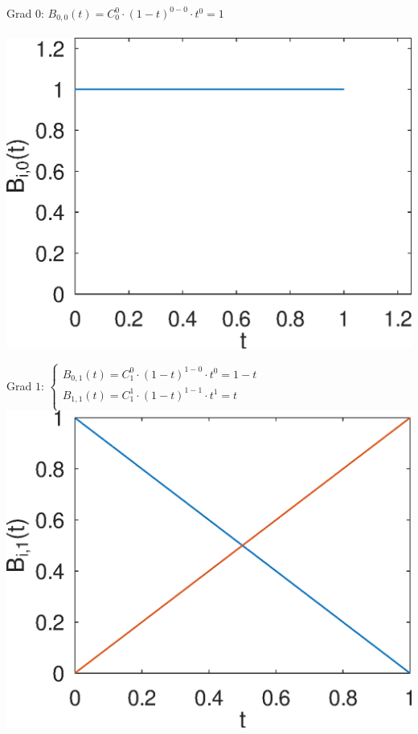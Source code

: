 \documentclass{article}
\begin{document}
\begin{minipage}[b]{0.5\textwidth}
    Grad $0$: $B_{0,0}(t) = C_0^0 \cdot (1-t)^{0-0} \cdot t^0 = 1$\\\\
    \includegraphics[scale=0.5]{bernstein_0}
\end{minipage}
\hspace{0.75cm}\begin{minipage}[b]{0.5\textwidth}
    Grad $1$:
    $\begin{cases}
      B_{0,1}(t) = C_1^0 \cdot (1-t)^{1-0} \cdot t^0 = 1-t\\
      B_{1,1}(t) = C_1^1 \cdot (1-t)^{1-1} \cdot t^1 = t\\
    \end{cases}$
    \includegraphics[scale=0.5]{bernstein_1}
\end{minipage}\\
\end{document}
